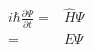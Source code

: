 \begin{align}
	i\hbar\frac{\partial \Psi}{\partial t} 
		= & \hat{H} \Psi \nonumber \\
	=& E \Psi
\end{align}